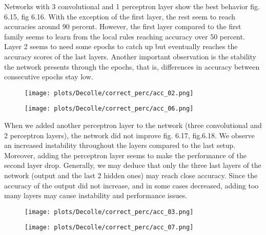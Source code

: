 \documentclass[12pt]{report}
\begin{document}
Networks with 3 convolutional and 1 perceptron layer show the best behavior fig. 6.15, fig 6.16. With the exception of the first layer, the rest seem to reach accuracies around 90 percent. However, the first layer compared to the first family seems to learn from the local rules reaching accuracy over 50 percent. Layer 2 seems to need some epochs to catch up but eventually reaches the accuracy scores of the last layers. Another important observation is the stability the network presents through the epochs, that is, differences in accuracy between consecutive epochs stay low.

\begin{figure}
\centering
\begin{minipage}{.4\textwidth}
  \centering
  \texttt{[image: plots/Decolle/correct\_perc/acc\_02.png]}
  \label{fig:test1}
\end{minipage}
\begin{minipage}{.4\textwidth}
  \centering
  \texttt{[image: plots/Decolle/correct\_perc/acc\_06.png]}
  \label{fig:test2}
\end{minipage}
\end{figure}

When we added another perceptron layer to the network (three convolutional and 2 perceptron layers), the network did not improve fig. 6.17, fig.6.18. We observe an increased instability throughout the layers compared to the last setup. Moreover, adding the perceptron layer seems to make the performance of the second layer drop. Generally, we may deduce that only the three last layers of the network (output and the last 2 hidden ones) may reach close accuracy. Since the accuracy of the output did not increase, and in some cases decreased, adding too many layers may cause instability and performance issues.

\begin{figure}
\centering
\begin{minipage}{.4\textwidth}
  \centering
  \texttt{[image: plots/Decolle/correct\_perc/acc\_03.png]}
  \label{fig:test1}
\end{minipage}
\begin{minipage}{.4\textwidth}
  \centering
  \texttt{[image: plots/Decolle/correct\_perc/acc\_07.png]}
  \label{fig:test2}
\end{minipage}
\end{figure}
\end{document}
